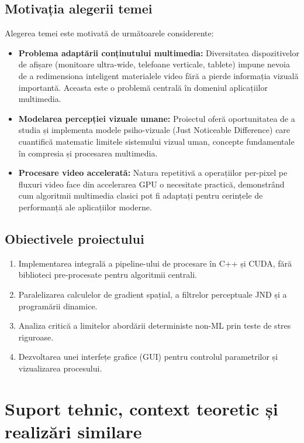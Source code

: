 \documentclass[12pt,a4paper]{article}
\begin{document}
\subsection{Motivația alegerii temei}
Alegerea temei este motivată de următoarele considerente:
\begin{itemize}[noitemsep]
    \item \textbf{Problema adaptării conținutului multimedia:} Diversitatea dispozitivelor de afișare (monitoare ultra-wide, telefoane verticale, tablete) impune nevoia de a redimensiona inteligent materialele video fără a pierde informația vizuală importantă. Aceasta este o problemă centrală în domeniul aplicațiilor multimedia.
    \item \textbf{Modelarea percepției vizuale umane:} Proiectul oferă oportunitatea de a studia și implementa modele psiho-vizuale (Just Noticeable Difference) care cuantifică matematic limitele sistemului vizual uman, concepte fundamentale în compresia și procesarea multimedia.
    \item \textbf{Procesare video accelerată:} Natura repetitivă a operațiilor per-pixel pe fluxuri video face din accelerarea GPU o necesitate practică, demonstrând cum algoritmii multimedia clasici pot fi adaptați pentru cerințele de performanță ale aplicațiilor moderne.
\end{itemize}
\subsection{Obiectivele proiectului}
\begin{enumerate}[noitemsep]
    \item Implementarea integrală a pipeline-ului de procesare în C++ și CUDA, fără biblioteci pre-procesate pentru algoritmii centrali.
    \item Paralelizarea calculelor de gradient spațial, a filtrelor perceptuale JND și a programării dinamice.
    \item Analiza critică a limitelor abordării deterministe non-ML prin teste de stres riguroase.
    \item Dezvoltarea unei interfețe grafice (GUI) pentru controlul parametrilor și vizualizarea procesului.
\end{enumerate}
\newpage
\section{Suport tehnic, context teoretic și realizări similare}
\end{document}
